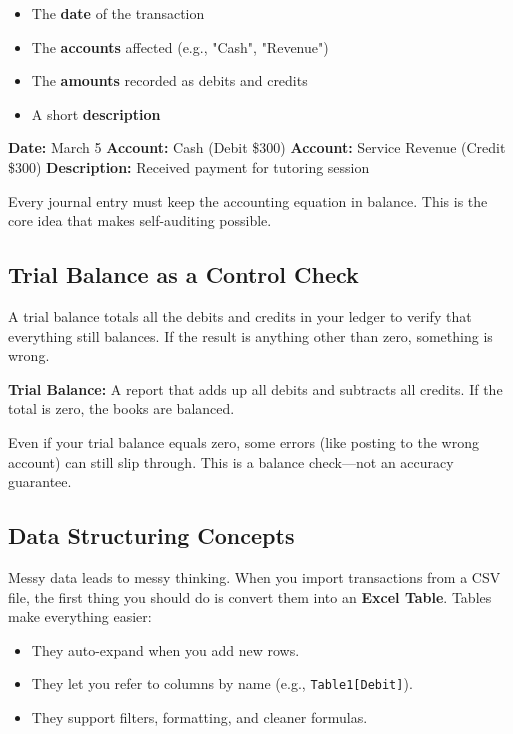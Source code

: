 \begin{itemize}
\item The \textbf{date} of the transaction
\item The \textbf{accounts} affected (e.g., "Cash", "Revenue")
\item The \textbf{amounts} recorded as debits and credits
\item A short \textbf{description}
\end{itemize}

\begin{Example}
\textbf{Date:} March 5\newline
\textbf{Account:} Cash (Debit \$300)\newline
\textbf{Account:} Service Revenue (Credit \$300)\newline
\textbf{Description:} Received payment for tutoring session
\end{Example}

Every journal entry must keep the accounting equation in balance. This is the core idea that makes self-auditing possible.

\subsection{Trial Balance as a Control Check}
A trial balance totals all the debits and credits in your ledger to verify that everything still balances. If the result is anything other than zero, something is wrong.

\begin{Definition}
\textbf{Trial Balance:} A report that adds up all debits and subtracts all credits. If the total is zero, the books are balanced.
\end{Definition}

\begin{Warning}
Even if your trial balance equals zero, some errors (like posting to the wrong account) can still slip through. This is a balance check—not an accuracy guarantee.
\end{Warning}

\subsection{Data Structuring Concepts}
Messy data leads to messy thinking. When you import transactions from a CSV file, the first thing you should do is convert them into an \textbf{Excel Table}. Tables make everything easier:

\begin{itemize}
\item They auto-expand when you add new rows.
\item They let you refer to columns by name (e.g., \verb|Table1[Debit]|).
\item They support filters, formatting, and cleaner formulas.
\end{itemize}


